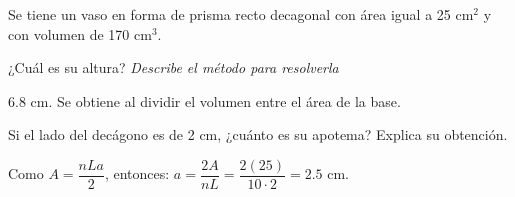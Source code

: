 Se tiene un vaso en forma de prisma recto decagonal con área igual a 25 cm$^2$ y con volumen de 170 cm$^3$.

\begin{parts}
    ¿Cuál es su altura? \emph{Describe el método para resolverla}

    \begin{solutionbox}{1.5cm}
        6.8 cm. Se obtiene al dividir el volumen entre el área de la base.
    \end{solutionbox}

    Si el lado del decágono es de 2 cm, ¿cuánto es su apotema? Explica su
    obtención.

    \begin{solutionbox}{2cm}
        Como $A =\dfrac{n L a}{2}$, entonces: $a = \dfrac{2A}{n  L} = \dfrac{2(25)}{10 \cdot 2} = 2.5$ cm.
    \end{solutionbox}
\end{parts}